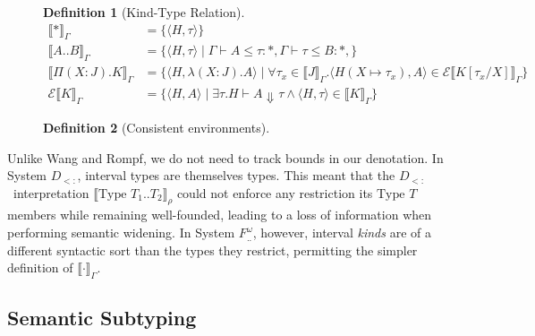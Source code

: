 \documentclass[a4paper, 10pt]{article}
\newcommand{\Fwint}{\ensuremath{F^\omega_{..}}}
\newcommand{\Dsub}{\ensuremath{D_{<:}}}
\newcommand{\interval}[2]{#1 .. #2}
\newcommand{\TyKd}{*}
\newcommand{\KDepArr}[3]{\Pi(#1:#2).#3}
\newcommand{\subst}[3]{#1[#2/#3]}
\newcommand{\isenv}[1]{#1\ \texttt{env}}
\newcommand{\stepsn}[1][]{\Downarrow^{#1}}
\newcommand{\KDenot}[2][\Gamma]{\llbracket #2 \rrbracket_{#1}}
\newcommand{\KEval}[2][\Gamma]{\mathscr{E}\llbracket #2 \rrbracket_{#1}}
\newtheorem{defn}{Definition}
\begin{document}
\begin{figure}[ht]
  \begin{defn}[Kind-Type Relation]
    \begin{align*}
      \KDenot{\TyKd} &= \{ \langle H, \tau \rangle \} \\
      \KDenot{\interval{A}{B}} &=
        \{ \langle H, \tau \rangle \mid
           \Gamma \vdash A \le \tau : \TyKd,
           \Gamma \vdash \tau \le B : \TyKd,
        \} \\
      \KDenot{\KDepArr{X}{J}{K}} &=
        \{ \langle H, \lambda(X:J).A \rangle \mid
           \forall \tau_x \in \KDenot{J} .
             \langle H(X \mapsto \tau_x), A \rangle \in
             \KEval[\Gamma]{\subst{K}{\tau_x}{X}}
        \} \\
      \KEval{K} &=
        \{ \langle H, A \rangle \mid
           \exists \tau .
             H \vdash A \stepsn \tau \land
             \langle H, \tau \rangle \in \KDenot{K}
        \}
    \end{align*}
  \end{defn}
\end{figure}

\begin{figure}[ht]
  \begin{defn}[Consistent environments]
  \end{defn}
\end{figure}

Unlike Wang and Rompf, we do not need to track bounds in our denotation. In
System \Dsub, interval types are themselves types. This meant that the
\Dsub\ interpretation $\KDenot[\rho]{\text{Type }T_1..T_2}$ could not enforce
any restriction its $\text{Type }T$ members while remaining well-founded,
leading to a loss of information when performing semantic widening. In System
\Fwint, however, interval \emph{kinds} are of a different syntactic sort than
the types they restrict, permitting the simpler definition of $\KDenot{\cdot}$.

\subsection{Semantic Subtyping}
\end{document}
